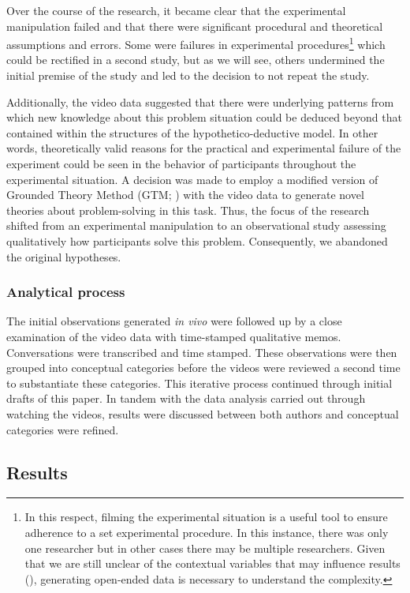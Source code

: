 \documentclass[twocolumn, issue, empirical, authordate,drafn]{jote-new-article}
\begin{document}
Over the course of the research, it became clear that the experimental manipulation failed and that there were significant procedural and theoretical assumptions and errors. Some were failures in experimental procedures\footnote{ In this respect, filming the experimental situation is a useful tool to ensure adherence to a set experimental procedure. In this instance, there was only one researcher but in other cases there may be multiple researchers. Given that we are still unclear of the contextual variables that may influence results (), generating open-ended data is necessary to understand the complexity.} which could be rectified in a second study, but as we will see, others undermined the initial premise of the study and led to the decision to not repeat the study. 

Additionally, the video data suggested that there were underlying patterns from which new knowledge about this problem situation could be deduced beyond that contained within the structures of the hypothetico-deductive model. In other words, theoretically valid reasons for the practical and experimental failure of the experiment could be seen in the behavior of participants throughout the experimental situation. A decision was made to employ a modified version of Grounded Theory Method (GTM; ) with the video data to generate novel theories about problem-solving in this task. Thus, the focus of the research shifted from an experimental manipulation to an observational study assessing qualitatively how participants solve this problem. Consequently, we abandoned the original hypotheses. 

\subsubsection{Analytical process}

The initial observations generated \textit{in vivo} were followed up by a close examination of the video data with time-stamped qualitative memos. Conversations were transcribed and time stamped. These observations were then grouped into conceptual categories before the videos were reviewed a second time to substantiate these categories. This iterative process continued through initial drafts of this paper. In tandem with the data analysis carried out through watching the videos, results were discussed between both authors and conceptual categories were refined. 


\subsection{Results}
\end{document}
